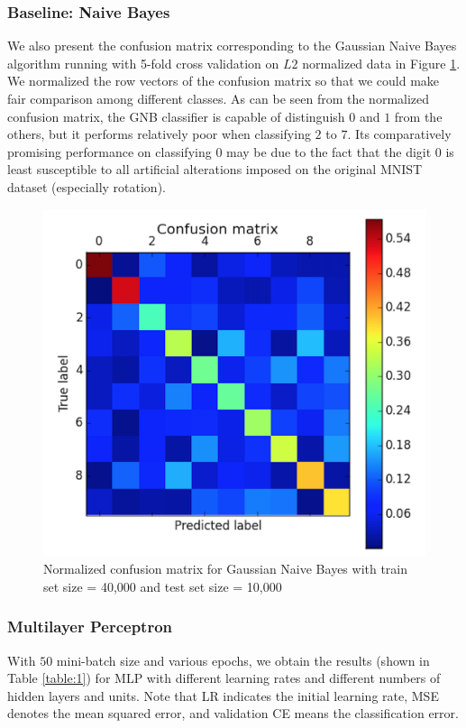 \documentclass{acm_proc_article-sp}
\begin{document}
\subsubsection{Baseline: Naive Bayes}
We also present the confusion matrix corresponding to the Gaussian Naive Bayes algorithm running with 5-fold cross validation on $L2$ normalized data in Figure \ref{fig:gnb_cm}. We normalized the row vectors of the confusion matrix so that we could make fair comparison among different classes. As can be seen from the normalized confusion matrix, the GNB classifier is capable of distinguish $0$ and $1$ from the others, but it performs relatively poor when classifying $2$ to $7$. Its comparatively promising performance on classifying $0$ may be due to the fact that the digit $0$ is least susceptible to all artificial alterations imposed on the original MNIST dataset (especially rotation).
\begin{figure} 
\centering
\includegraphics[width=0.73\columnwidth]{graphs/gnb_cm1.png}  
\caption{Normalized confusion matrix for Gaussian Naive Bayes with train set size = 40,000 and test set size = 10,000}
\label{fig:gnb_cm}
\end{figure}


\subsubsection{Multilayer Perceptron}

With $50$ mini-batch size and various epochs, we obtain the  results (shown in Table \ref{table:1}) for MLP with different learning rates and different numbers of hidden layers and units. Note that LR indicates the initial learning rate, MSE denotes the mean squared error, and  validation CE means the classification error.
\end{document}

